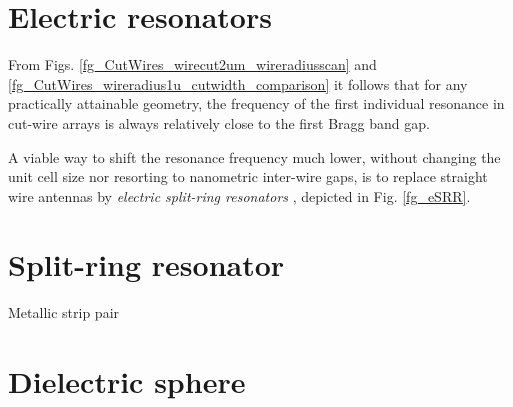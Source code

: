 \section{Electric resonators} \label{section_esrr} %
From Figs. \ref{fg_CutWires_wirecut2um_wireradiusscan} and \ref{fg_CutWires_wireradius1u_cutwidth_comparison} it follows that for any practically attainable geometry, the frequency of the first individual resonance in cut-wire arrays is always relatively close to the first Bragg band gap. 

A viable way to shift the resonance frequency much lower, without changing the unit cell size nor resorting to nanometric inter-wire gaps, is to replace straight wire antennas by \textit{electric split-ring resonators} \cite{TODO}, depicted in Fig. \ref{fg_eSRR}.




\section{Split-ring resonator} \label{section_srr} %
Metallic strip pair






\section{Dielectric sphere} %



